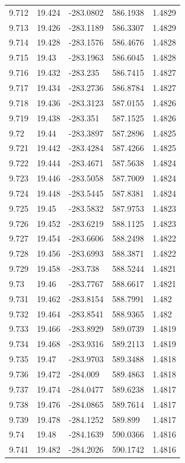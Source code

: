 \begin{tabular}{lllll}
9.712 & 19.424 & -283.0802 & 586.1938 & 1.4829 \\
9.713 & 19.426 & -283.1189 & 586.3307 & 1.4829 \\
9.714 & 19.428 & -283.1576 & 586.4676 & 1.4828 \\
9.715 & 19.43 & -283.1963 & 586.6045 & 1.4828 \\
9.716 & 19.432 & -283.235 & 586.7415 & 1.4827 \\
9.717 & 19.434 & -283.2736 & 586.8784 & 1.4827 \\
9.718 & 19.436 & -283.3123 & 587.0155 & 1.4826 \\
9.719 & 19.438 & -283.351 & 587.1525 & 1.4826 \\
9.72 & 19.44 & -283.3897 & 587.2896 & 1.4825 \\
9.721 & 19.442 & -283.4284 & 587.4266 & 1.4825 \\
9.722 & 19.444 & -283.4671 & 587.5638 & 1.4824 \\
9.723 & 19.446 & -283.5058 & 587.7009 & 1.4824 \\
9.724 & 19.448 & -283.5445 & 587.8381 & 1.4824 \\
9.725 & 19.45 & -283.5832 & 587.9753 & 1.4823 \\
9.726 & 19.452 & -283.6219 & 588.1125 & 1.4823 \\
9.727 & 19.454 & -283.6606 & 588.2498 & 1.4822 \\
9.728 & 19.456 & -283.6993 & 588.3871 & 1.4822 \\
9.729 & 19.458 & -283.738 & 588.5244 & 1.4821 \\
9.73 & 19.46 & -283.7767 & 588.6617 & 1.4821 \\
9.731 & 19.462 & -283.8154 & 588.7991 & 1.482 \\
9.732 & 19.464 & -283.8541 & 588.9365 & 1.482 \\
9.733 & 19.466 & -283.8929 & 589.0739 & 1.4819 \\
9.734 & 19.468 & -283.9316 & 589.2113 & 1.4819 \\
9.735 & 19.47 & -283.9703 & 589.3488 & 1.4818 \\
9.736 & 19.472 & -284.009 & 589.4863 & 1.4818 \\
9.737 & 19.474 & -284.0477 & 589.6238 & 1.4817 \\
9.738 & 19.476 & -284.0865 & 589.7614 & 1.4817 \\
9.739 & 19.478 & -284.1252 & 589.899 & 1.4817 \\
9.74 & 19.48 & -284.1639 & 590.0366 & 1.4816 \\
9.741 & 19.482 & -284.2026 & 590.1742 & 1.4816 \\

\end{tabular}
